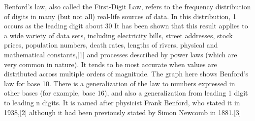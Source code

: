 Benford's law, also called the First-Digit Law, refers to the frequency distribution of digits in many (but not all) real-life sources of data. In this distribution, 1 occurs as the leading digit about 30%
It has been shown that this result applies to a wide variety of data sets, including electricity bills, street addresses, stock prices, population numbers, death rates, lengths of rivers, physical and mathematical constants,[1] and processes described by power laws (which are very common in nature). It tends to be most accurate when values are distributed across multiple orders of magnitude.
The graph here shows Benford's law for base 10. There is a generalization of the law to numbers expressed in other bases (for example, base 16), and also a generalization from leading 1 digit to leading n digits.
It is named after physicist Frank Benford, who stated it in 1938,[2] although it had been previously stated by Simon Newcomb in 1881.[3]
